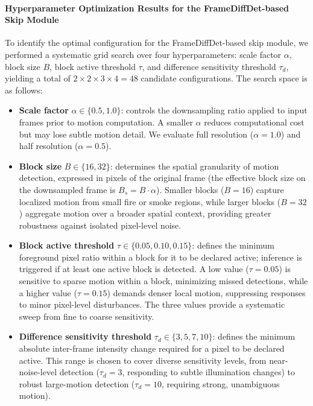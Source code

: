 \documentclass[
  10pt,
]{article}
\begin{document}
\paragraph{Hyperparameter Optimization Results for the
FrameDiffDet-based Skip
Module}\label{hyperparameter-optimization-results-for-the-framediffdet-based-skip-module}

To identify the optimal configuration for the FrameDiffDet-based skip
module, we performed a systematic grid search over four hyperparameters:
scale factor \(\alpha\), block size \(B\), block active threshold
\(\tau\), and difference sensitivity threshold \(\tau_d\), yielding a
total of \(2 \times 2 \times 3 \times 4 = 48\) candidate configurations.
The search space is as follows:

\begin{itemize}
\item
  \textbf{Scale factor} \(\alpha \in \{0.5, 1.0\}\): controls the
  downsampling ratio applied to input frames prior to motion
  computation. A smaller \(\alpha\) reduces computational cost but may
  lose subtle motion detail. We evaluate full resolution
  (\(\alpha = 1.0\)) and half resolution (\(\alpha = 0.5\)).
\item
  \textbf{Block size} \(B \in \{16, 32\}\): determines the spatial
  granularity of motion detection, expressed in pixels of the original
  frame (the effective block size on the downsampled frame is
  \(B_s = B \cdot \alpha\)). Smaller blocks (\(B = 16\)) capture
  localized motion from small fire or smoke regions, while larger blocks
  (\(B = 32\)) aggregate motion over a broader spatial context,
  providing greater robustness against isolated pixel-level noise.
\item
  \textbf{Block active threshold} \(\tau \in \{0.05, 0.10, 0.15\}\):
  defines the minimum foreground pixel ratio within a block for it to be
  declared active; inference is triggered if at least one active block
  is detected. A low value (\(\tau = 0.05\)) is sensitive to sparse
  motion within a block, minimizing missed detections, while a higher
  value (\(\tau = 0.15\)) demands denser local motion, suppressing
  responses to minor pixel-level disturbances. The three values provide
  a systematic sweep from fine to coarse sensitivity.
\item
  \textbf{Difference sensitivity threshold}
  \(\tau_d \in \{3, 5, 7, 10\}\): defines the minimum absolute
  inter-frame intensity change required for a pixel to be declared
  active. This range is chosen to cover diverse sensitivity levels, from
  near-noise-level detection (\(\tau_d = 3\), responding to subtle
  illumination changes) to robust large-motion detection
  (\(\tau_d = 10\), requiring strong, unambiguous motion).
\end{itemize}
\end{document}

